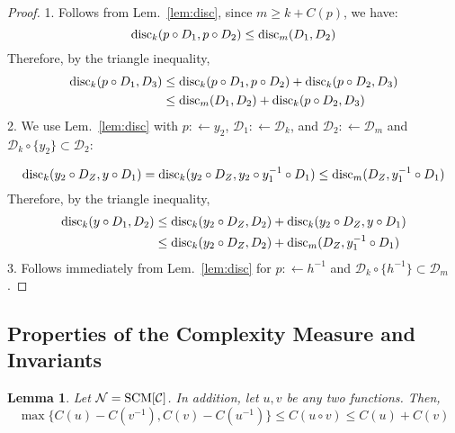 \documentclass{article} %
\newtheorem{lem}{Lemma}
\newcommand{\disc}{\textnormal{disc}}
\begin{document}
\begin{proof}
1. Follows from Lem.~\ref{lem:disc}, since $m \geq k+C(p)$, we have:
\begin{equation}
\disc_{k}(p\circ D_1, p \circ D_2) \leq \disc_{m}(D_1, D_2)
\end{equation}
Therefore, by the triangle inequality, 
\begin{equation}
\begin{aligned}
\disc_{k}(p \circ D_1, D_3) &\leq \disc_{k}(p\circ D_1, p \circ D_2) +  
\disc_{k}(p \circ D_2, D_3) \\
&\leq \disc_{m}(D_1, D_2) + 
\disc_{k}(p \circ D_2, D_3)
\end{aligned}
\end{equation}
2. We use Lem.~\ref{lem:disc} with $p :\leftarrow y_2$, $\mathcal{D}_1 :\leftarrow \mathcal{D}_k$,  and $\mathcal{D}_2 :\leftarrow \mathcal{D}_m$ and $\mathcal{D}_k\circ \{y_2\} \subset \mathcal{D}_2$:

\begin{equation}
\disc_{k}(y_2\circ D_Z, y \circ D_1) = \disc_{k}(y_2\circ D_Z, y_2 \circ y^{-1}_1 \circ D_1) \leq \disc_{m}(D_Z, y^{-1}_1 \circ D_1)
\end{equation}
Therefore, by the triangle inequality, 
\begin{equation}
\begin{aligned}
\disc_{k}(y \circ D_1, D_2) &\leq 
\disc_{k}(y_2 \circ D_Z, D_2) + 
\disc_{k}(y_2\circ D_Z, y \circ D_1) \\
&\leq \disc_{k}(y_2 \circ D_Z, D_2) + 
\disc_{m}(D_Z, y^{-1}_1 \circ D_1)
\end{aligned}
\end{equation}
3. Follows immediately from Lem.~\ref{lem:disc} for $p:\leftarrow h^{-1}$ and $\mathcal{D}_k \circ \{h^{-1}\}\subset \mathcal{D}_m$.
\end{proof}

 



\subsection{Properties of the Complexity Measure and Invariants}

\label{sec:propcompl}

 

\begin{lem}\label{lem:A1} Let $\mathcal{N} =  \textnormal{SCM}[\mathcal{C}]$. In addition, let $u,v$ be any two functions. Then,
\begin{equation}
\max \{C(u) - C(v^{-1}), C(v) - C(u^{-1})\} \leq C(u\circ v) \leq C(u) + C(v)
\end{equation}
\end{lem}
\end{document}
